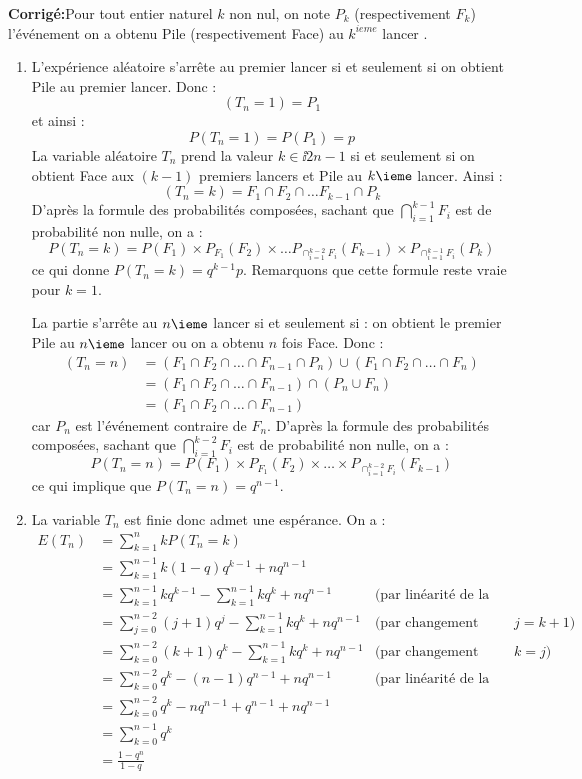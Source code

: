\documentclass[a4paper,twoside,french,11pt]{VcCours}
\newcommand{\corr}{\textbf{Corrigé:}}
\begin{document}
\corr Pour tout entier naturel $k$ non nul, on note $P_k$ (respectivement $F_k$) l'événement \og on a obtenu Pile (respectivement Face) au $k^{ieme}$ lancer \fg.
\begin{enumerate}
\item  L'expérience aléatoire s'arrête au premier lancer si et seulement si on obtient \og Pile \fg au premier lancer. Donc : 
$$(T_n=1) = P_1$$
et ainsi :
\[ P(T_n=1) = P(P_1) = p\]
La variable aléatoire $T_n$ prend la valeur $k \in \ii 2 {n-1} $ si et seulement si on obtient Face aux $(k-1)$ premiers lancers et Pile au $k\ieme$ lancer. Ainsi :
$$ (T_n = k) = F_1\cap F_2\cap \dots F_{k-1} \cap P_k$$
D'après la formule des probabilités composées, sachant que $\bigcap_{i=1}^{k-1} F_i$ est de probabilité non nulle,  on a : 
$$ P(T_n=k) = P(F_1)\times P_{F_1}(F_2)\times \dots P_{\cap_{i=1}^{k-2} F_i}(F_{k-1}) \times P_{\cap_{i=1}^{k-1} F_i}(P_k)$$
ce qui donne $P(T_n=k) = q^{k-1}p$. Remarquons que cette formule reste vraie pour $k=1$.


La partie s'arrête au $n\ieme$ lancer si et seulement si : \og on obtient le premier Pile au $n\ieme$ lancer \fg ou \og on a obtenu $n$ fois Face\fg. Donc :
\begin{align*}
(T_n=n) &= \left(F_1 \cap F_2 \cap \dots \cap F_{n-1} \cap P_n\right) \cup \left(F_1 \cap F_2 \cap \dots \cap F_{n} \right)\\
&= \left(F_1 \cap F_2 \cap \dots \cap F_{n-1}\right)\cap (P_n\cup F_n)\\
&=\left(F_1 \cap F_2 \cap \dots \cap F_{n-1}\right)
\end{align*}
car $P_n$ est l'événement contraire de $F_n$. D'après la formule des probabilités composées, sachant que $\bigcap_{i=1}^{k-2} F_i$ est de probabilité non nulle, on a :
$$P(T_n=n) = P(F_1)\times P_{F_1}(F_2)\times \dots \times P_{\cap_{i=1}^{k-2} F_i}(F_{k-1}) $$
ce qui implique que $P(T_n=n) = q^{n-1}$.

\item La variable $T_n$ est finie donc admet une espérance. On a :
\begin{align*}
 E(T_n) & = \sum_{k=1}^n k P(T_n=k) \\
 & = \sum_{k=1}^{n-1} k(1-q)q^{k-1} + n q^{n-1}\\
 & = \sum_{k=1}^{n-1} k q^{k-1} - \sum_{k=1}^{n-1} kq^{k} + n q^{n-1} & \text{(par linéarité de la somme)}\\
 & =  \sum_{j=0}^{n-2} (j+1)q^{j} - \sum_{k=1}^{n-1} kq^{k} + nq^{n-1} & \text{(par changement d'indice }j=k+1)\\
 & =  \sum_{k=0}^{n-2} (k+1)q^{k} - \sum_{k=1}^{n-1} kq^{k} + nq^{n-1} &\text{(par changement d'indice }k=j)\\
 & =  \sum_{k=0}^{n-2} q^k - (n-1)q^{n-1} + n q^{n-1} & \text{(par linéarité de la somme)}\\
 &=  \sum_{k=0}^{n-2} q^k - nq^{n-1} + q^{n-1} + n q^{n-1} \\
 &= \sum_{k=0}^{n-1} q^k \\
 & = \frac{1-q^n}{1-q}  
\end{align*}


\end{enumerate}
\end{document}
